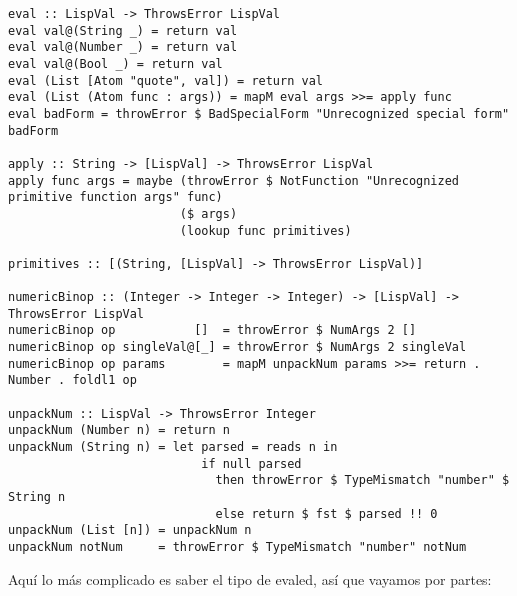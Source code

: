 \begin{minipage}{\linewidth}
\begin{small}
\begin{lstlisting}[frame=single]
eval :: LispVal -> ThrowsError LispVal
eval val@(String _) = return val
eval val@(Number _) = return val
eval val@(Bool _) = return val
eval (List [Atom "quote", val]) = return val
eval (List (Atom func : args)) = mapM eval args >>= apply func
eval badForm = throwError $ BadSpecialForm "Unrecognized special form" badForm

apply :: String -> [LispVal] -> ThrowsError LispVal
apply func args = maybe (throwError $ NotFunction "Unrecognized primitive function args" func)
                        ($ args)
                        (lookup func primitives)

primitives :: [(String, [LispVal] -> ThrowsError LispVal)]

numericBinop :: (Integer -> Integer -> Integer) -> [LispVal] -> ThrowsError LispVal
numericBinop op           []  = throwError $ NumArgs 2 []
numericBinop op singleVal@[_] = throwError $ NumArgs 2 singleVal
numericBinop op params        = mapM unpackNum params >>= return . Number . foldl1 op

unpackNum :: LispVal -> ThrowsError Integer
unpackNum (Number n) = return n
unpackNum (String n) = let parsed = reads n in 
                           if null parsed 
                             then throwError $ TypeMismatch "number" $ String n
                             else return $ fst $ parsed !! 0
unpackNum (List [n]) = unpackNum n
unpackNum notNum     = throwError $ TypeMismatch "number" notNum
\end{lstlisting}
\end{small}
\end{minipage}

Aqu\'i lo m\'as complicado es saber el tipo de evaled, as\'i que vayamos por partes:\\

